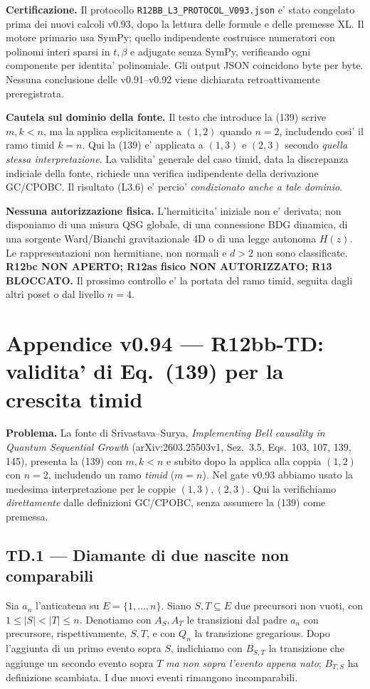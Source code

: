 \documentclass[11pt,a4paper]{article}
\begin{document}
\textbf{Certificazione.} Il protocollo \texttt{R12BB\_L3\_PROTOCOL\_V093.json} e' stato congelato prima dei nuovi calcoli v0.93, dopo la lettura delle formule e delle premesse XL. Il motore primario usa SymPy; quello indipendente costruisce numeratori con polinomi interi sparsi in $t,\beta$ e adjugate senza SymPy, verificando ogni componente per identita' polinomiale. Gli output JSON coincidono byte per byte. Nessuna conclusione delle v0.91--v0.92 viene dichiarata retroattivamente preregistrata.

\textbf{Cautela sul dominio della fonte.} Il testo che introduce la (139) scrive $m,k<n$, ma la applica esplicitamente a $(1,2)$ quando $n=2$, includendo cosi' il ramo timid $k=n$. Qui la (139) e' applicata a $(1,3)$ e $(2,3)$ secondo \emph{quella stessa interpretazione}. La validita' generale del caso timid, data la discrepanza indiciale della fonte, richiede una verifica indipendente della derivazione GC/CPOBC. Il risultato (L3.6) e' percio' \emph{condizionato anche a tale dominio}.

\textbf{Nessuna autorizzazione fisica.} L'hermiticita' iniziale non e' derivata; non disponiamo di una misura QSG globale, di una connessione BDG dinamica, di una sorgente Ward/Bianchi gravitazionale 4D o di una legge autonoma $H(z)$. Le rappresentazioni non hermitiane, non normali e $d>2$ non sono classificate. \textbf{R12bc NON APERTO; R12as fisico NON AUTORIZZATO; R13 BLOCCATO.} Il prossimo controllo e' la portata del ramo timid, seguita dagli altri poset o dal livello $n=4$.
\endgroup
\clearpage
\begingroup
\setlength{\parskip}{0.16em}
\section*{Appendice v0.94 --- R12bb-TD: validita' di Eq.~(139) per la crescita timid}
\textbf{Problema.} La fonte di Srivastava--Surya, \emph{Implementing Bell causality in Quantum Sequential Growth} (arXiv:2603.25503v1, Sez.~3.5, Eqs.~103, 107, 139, 145), presenta la (139) con $m,k<n$ e subito dopo la applica alla coppia $(1,2)$ con $n=2$, includendo un ramo \emph{timid} ($m=n$). Nel gate v0.93 abbiamo usato la medesima interpretazione per le coppie $(1,3),(2,3)$. Qui la verifichiamo \emph{direttamente} dalle definizioni GC/CPOBC, senza assumere la (139) come premessa.

\subsection*{TD.1 --- Diamante di due nascite non comparabili}
Sia $a_n$ l'anticatena su $E=\{1,\ldots,n\}$. Siano $S,T\subseteq E$ due precursori non vuoti, con $1\le |S|<|T|\le n$. Denotiamo con $A_S,A_T$ le transizioni dal padre $a_n$ con precursore, rispettivamente, $S,T$, e con $Q_n$ la transizione gregarious. Dopo l'aggiunta di un primo evento sopra $S$, indichiamo con $B_{S,T}$ la transizione che aggiunge un secondo evento sopra $T$ \emph{ma non sopra l'evento appena nato}; $B_{T,S}$ ha definizione scambiata. I due nuovi eventi rimangono incomparabili.
\end{document}
